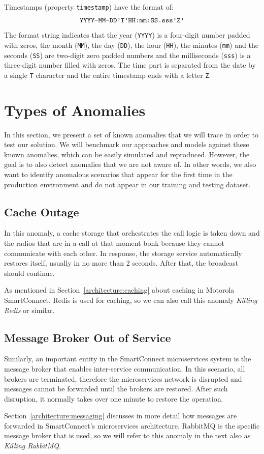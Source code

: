Timestamps (property \texttt{timestamp}) have the format of:\\
\begin{equation*}
    \text{\texttt{YYYY-MM-DD'T'HH:mm:SS.sss'Z'}}
\end{equation*}
The format string indicates that the year (\texttt{YYYY}) is a four-digit number padded with zeros, the month (\texttt{MM}), the day (\texttt{DD}), the hour (\texttt{HH}), the minutes (\texttt{mm}) and the seconds (\texttt{SS}) are two-digit zero padded numbers and the milliseconds (\texttt{sss}) is a three-digit number filled with zeros. The time part is separated from the date by a single \texttt{T} character and the entire timestamp ends with a letter \texttt{Z}.

\section{Types of Anomalies}
\label{anomaly_types}
In this section, we present a set of known anomalies that we will trace in order to test our solution.
We will benchmark our approaches and models against these known anomalies, which can be easily simulated and reproduced. 
However, the goal is to also detect anomalies that we are not aware of.
In other words, we also want to identify anomalous scenarios that appear for the first time in the production environment and do not appear in our training and testing dataset.

\subsection{Cache Outage}
In this anomaly, a cache storage that orchestrates the call logic is taken down and the radios that are in a call at that moment bonk because they cannot communicate with each other.
In response, the storage service automatically restores itself, usually in no more than 2 seconds. After that, the broadcast should continue.

As mentioned in Section~\ref{architecture:caching} about caching in Motorola SmartConnect, Redis is used for caching, so we can also call this anomaly \textit{Killing Redis} or similar.

\subsection{Message Broker Out of Service}
Similarly, an important entity in the SmartConnect microservices system is the message broker that enables inter-service communication. In this scenario, all brokers are terminated, therefore the microservices network is disrupted and messages cannot be forwarded until the brokers are restored. After such disruption, it normally takes over one minute to restore the operation.

Section~\ref{architecture:messaging} discusses in more detail how messages are forwarded in SmartConnect's microservices architecture. RabbitMQ is the specific message broker that is used, so we will refer to this anomaly in the text also as \textit{Killing RabbitMQ}.
